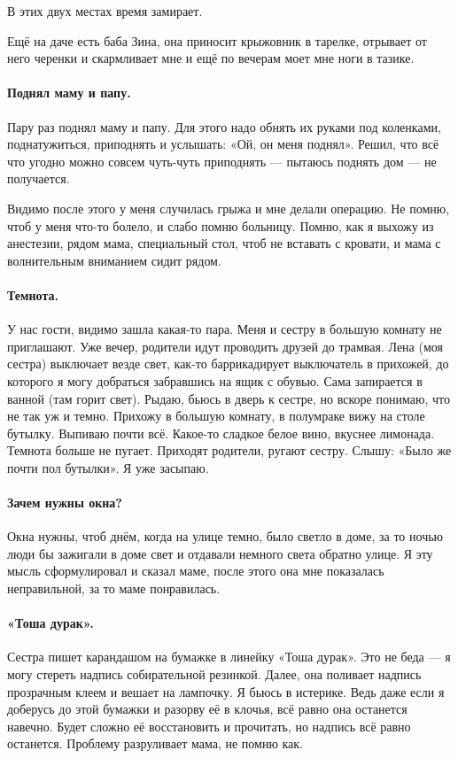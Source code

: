 \documentclass{book}
\begin{document}
В этих двух местах время замирает.

Ещё на даче есть баба Зина, она приносит крыжовник в тарелке, отрывает от него черенки и скармливает мне и
ещё по вечерам моет мне ноги в тазике.

\paragraph{Поднял маму и папу.}
Пару раз поднял маму и папу.
Для этого надо обнять их руками под коленками, поднатужиться, приподнять и услышать: «Ой, он меня поднял».
Решил, что всё что угодно можно совсем чуть-чуть приподнять --- пытаюсь поднять дом --- не получается.

Видимо после этого у меня случилась грыжа и мне делали операцию.
Не помню, чтоб у меня что-то болело, и слабо помню больницу.
Помню, как я выхожу из анестезии, рядом мама, специальный стол, чтоб не вставать с кровати, и мама с волнительным вниманием сидит рядом.

\paragraph{Темнота.}
У нас гости, видимо зашла какая-то пара.
Меня и сестру в большую комнату не приглашают.
Уже вечер, родители идут проводить друзей до трамвая.
Лена (моя сестра) выключает везде свет, 
как-то баррикадирует выключатель в прихожей, до которого я могу добраться забравшись на ящик с обувью.
Сама запирается в ванной (там горит свет).
Рыдаю, бьюсь в дверь к сестре, но вскоре понимаю, что не так уж и темно.
Прихожу в большую комнату, в полумраке вижу на столе бутылку.
Выпиваю почти всё.
Какое-то сладкое белое вино, вкуснее лимонада.
Темнота больше не пугает.
Приходят родители, ругают сестру. 
Слышу: «Было же почти пол бутылки».
Я уже засыпаю.

\paragraph{Зачем нужны окна?}
Окна нужны, чтоб днём, когда на улице темно, было светло в доме,
за то ночью люди бы зажигали в доме свет и отдавали немного света обратно улице.
Я эту мысль сформулировал и сказал маме,
после этого она мне показалась неправильной, за то маме понравилась.

\paragraph{«Тоша дурак».}
Сестра пишет карандашом на бумажке в линейку «Тоша дурак».
Это не беда --- я могу стереть надпись собирательной резинкой.
Далее, она поливает надпись прозрачным клеем и вешает на лампочку.
Я бьюсь в истерике. 
Ведь даже если я доберусь до этой бумажки и разорву её в клочья, всё равно она останется навечно.
Будет сложно её восстановить и прочитать, но надпись всё равно останется.
Проблему разруливает мама, не помню как.
\end{document}
